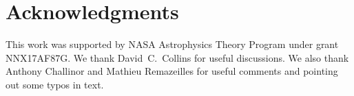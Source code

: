 \section*{Acknowledgments}

This work was supported by NASA Astrophysics Theory Program under grant NNX17AF87G.  We thank David~C.~Collins for useful discussions.  We also thank Anthony Challinor and Mathieu Remazeilles for useful comments and pointing out some typos in text.


